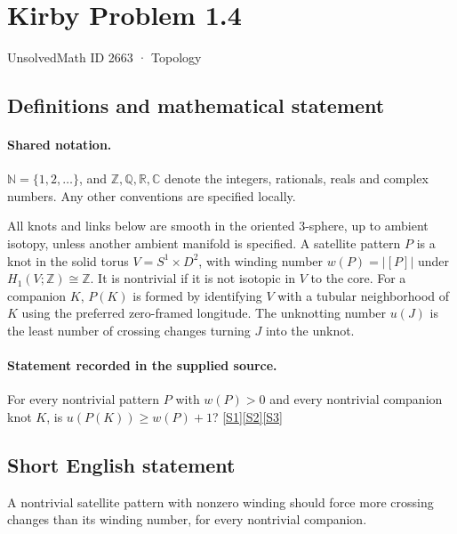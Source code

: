 \documentclass[11pt]{article}
\newcommand{\sref}[2]{\hyperlink{source:#1:#2}{[S#2]}}
\begin{document}
\setcounter{section}{2662}
\section{Kirby Problem 1.4}\label{2663}
{\small\sffamily UnsolvedMath ID 2663 · Topology}
\subsection{Definitions and mathematical statement}

\paragraph{Shared notation.}$\mathbb N=\{1,2,\ldots\}$, and $\mathbb Z,\mathbb Q,\mathbb R,\mathbb C$ denote the integers, rationals, reals and complex numbers. Any other conventions are specified locally.


All knots and links below are smooth in the oriented $3$-sphere, up to ambient isotopy, unless another ambient manifold is specified. A satellite pattern $P$ is a knot in the solid torus $V=S^1\times D^2$, with winding number $w(P)=|[P]|$ under $H_1(V;\mathbb Z)\cong\mathbb Z$. It is nontrivial if it is not isotopic in $V$ to the core. For a companion $K$, $P(K)$ is formed by identifying $V$ with a tubular neighborhood of $K$ using the preferred zero-framed longitude. The unknotting number $u(J)$ is the least number of crossing changes turning $J$ into the unknot.
\paragraph{Statement recorded in the supplied source.}
For every nontrivial pattern $P$ with $w(P)>0$ and every nontrivial companion knot $K$, is $u(P(K))\geq w(P)+1$? \sref{2663}{1}\sref{2663}{2}\sref{2663}{3}
\subsection{Short English statement}
A nontrivial satellite pattern with nonzero winding should force more crossing changes than its winding number, for every nontrivial companion.
\end{document}
